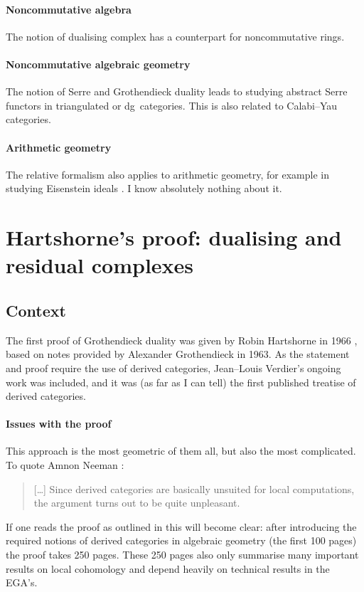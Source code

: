 \documentclass[10pt,a4paper]{article}
\begin{document}
\paragraph{Noncommutative algebra}
The notion of dualising complex has a counterpart for noncommutative rings.

\paragraph{Noncommutative algebraic geometry}
The notion of Serre and Grothendieck duality leads to studying abstract Serre functors in triangulated or dg~categories. This is also related to Calabi--Yau categories.

\paragraph{Arithmetic geometry}
The relative formalism also applies to arithmetic geometry, for example in studying Eisenstein ideals \cite{mazur-modular-curves-eisenstein-ideal}. I know absolutely nothing about it.


\section{Hartshorne's proof: dualising and residual complexes}
\label{section:hartshorne}
\subsection{Context}
\label{subsection:context}
The first proof of Grothendieck duality was given by Robin Hartshorne in 1966 \cite{hartshorne-residues-and-duality}, based on notes provided by Alexander Grothendieck in 1963. As the statement and proof require the use of derived categories, Jean--Louis Verdier's ongoing work was included, and it was (as far as I can tell) the first published treatise of derived categories.

\paragraph{Issues with the proof}
This approach is the most geometric of them all, but also the most complicated. To quote Amnon Neeman \cite{neeman-grothendieck-duality-bousfield-brown}:
\begin{quote}
  [\ldots] Since derived categories are basically unsuited for local computations, the argument turns out to be quite unpleasant.
\end{quote}
If one reads the proof as outlined in \cite{hartshorne-residues-and-duality} this will become clear: after introducing the required notions of derived categories in algebraic geometry (the first 100 pages) the proof takes 250 pages. These 250 pages also only summarise many important results on local cohomology and depend heavily on technical results in the EGA's.
\end{document}
